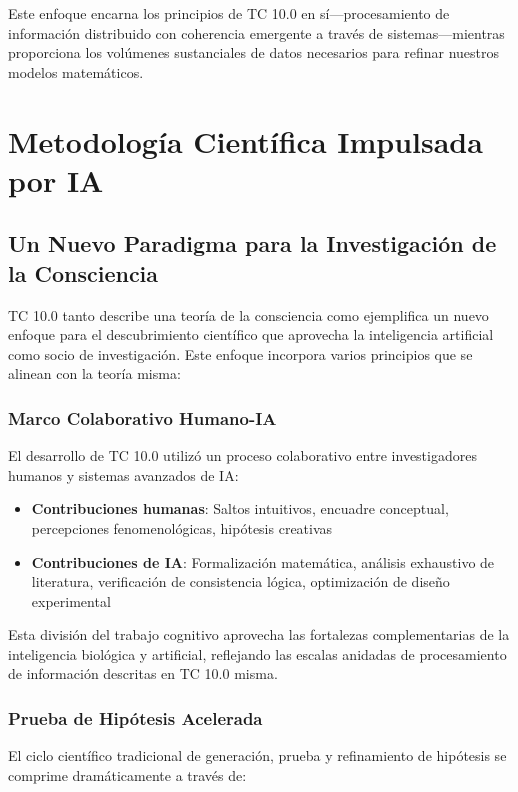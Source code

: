 \documentclass[12pt]{article}
\begin{document}
Este enfoque encarna los principios de TC 10.0 en sí—procesamiento de información distribuido con coherencia emergente a través de sistemas—mientras proporciona los volúmenes sustanciales de datos necesarios para refinar nuestros modelos matemáticos.

\section{Metodología Científica Impulsada por IA}

\subsection{Un Nuevo Paradigma para la Investigación de la Consciencia}

TC 10.0 tanto describe una teoría de la consciencia como ejemplifica un nuevo enfoque para el descubrimiento científico que aprovecha la inteligencia artificial como socio de investigación. Este enfoque incorpora varios principios que se alinean con la teoría misma:

\subsubsection{Marco Colaborativo Humano-IA}

El desarrollo de TC 10.0 utilizó un proceso colaborativo entre investigadores humanos y sistemas avanzados de IA:

\begin{itemize}
    \item \textbf{Contribuciones humanas}: Saltos intuitivos, encuadre conceptual, percepciones fenomenológicas, hipótesis creativas
    \item \textbf{Contribuciones de IA}: Formalización matemática, análisis exhaustivo de literatura, verificación de consistencia lógica, optimización de diseño experimental
\end{itemize}

Esta división del trabajo cognitivo aprovecha las fortalezas complementarias de la inteligencia biológica y artificial, reflejando las escalas anidadas de procesamiento de información descritas en TC 10.0 misma.

\subsubsection{Prueba de Hipótesis Acelerada}

El ciclo científico tradicional de generación, prueba y refinamiento de hipótesis se comprime dramáticamente a través de:
\end{document}
